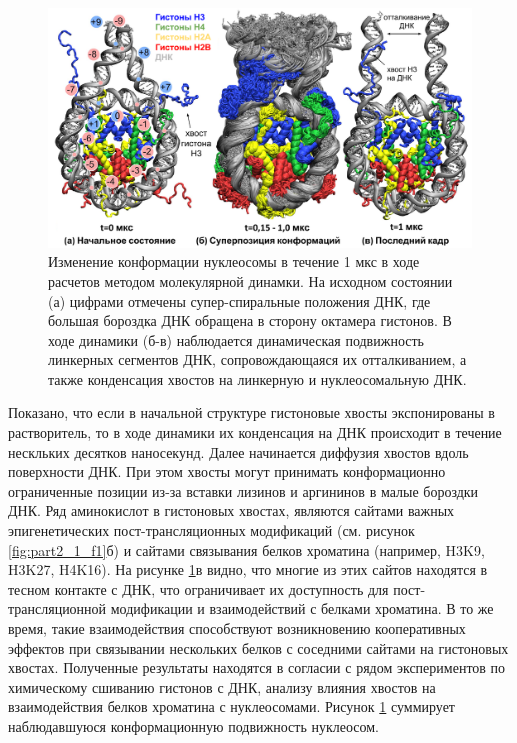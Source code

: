 \begin{figure} [H]
    \centering
    \includegraphics[width=\textwidth]{images/p2/jmb/part2_2_f1.pdf}
    \caption{Изменение конформации нуклеосомы в течение 1 мкс в ходе расчетов методом молекулярной динамки. На исходном состоянии (а) цифрами отмечены супер-спиральные положения ДНК, где большая бороздка ДНК обращена в сторону октамера гистонов. В ходе динамики (б-в) наблюдается динамическая подвижность линкерных сегментов ДНК, сопровождающаяся их отталкиванием, а также конденсация хвостов на линкерную и нуклеосомальную ДНК.}
    \label{fig:p2_2_f1}
\end{figure}

Показано, что если в начальной структуре гистоновые хвосты экспонированы в растворитель, то в ходе динамики их конденсация на ДНК происходит в течение нескльких десятков наносекунд. Далее начинается диффузия хвостов вдоль поверхности ДНК. При этом хвосты могут принимать конформационно ограниченные позиции из-за вставки  лизинов и аргининов в малые бороздки ДНК. Ряд аминокислот в гистоновых хвостах, являются сайтами важных эпигенетических пост-трансляционных модификаций (см. рисунок \ref{fig:part2_1_f1}б) и сайтами связывания белков хроматина (например, H3K9, H3K27, H4K16). На рисунке \ref{fig:p2_2_f1}в видно, что многие из этих сайтов находятся в тесном контакте с ДНК, что ограничивает их доступность для пост-трансляционной модификации и взаимодействий с белками хроматина. В то же время, такие взаимодействия способствуют возникновению кооперативных эффектов при связывании нескольких белков с соседними сайтами на гистоновых хвостах. Полученные результаты находятся в согласии  с рядом экспериментов по химическому сшиванию гистонов с ДНК, анализу влияния хвостов на взаимодействия белков хроматина с нуклеосомами.  Рисунок \ref{fig:p2_2_f1} суммирует наблюдавшуюся конформационную подвижность нуклеосом.

